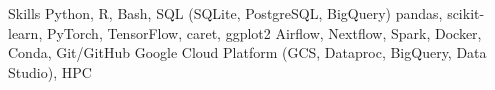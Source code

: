 \section{\faGears}{Skills}
 \resumeEntryStart
   {Python, R, Bash, SQL (SQLite, PostgreSQL, BigQuery)}
   {pandas, scikit-learn, PyTorch, TensorFlow, caret, ggplot2}
   {Airflow, Nextflow, Spark, Docker, Conda, Git/GitHub}  %
   {Google Cloud Platform (GCS, Dataproc, BigQuery, Data Studio), HPC}
 \resumeEntryEnd

\vspace{5pt}
